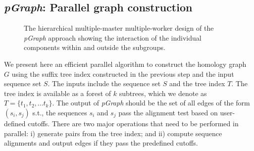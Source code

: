 \documentclass[10pt,journal,letterpaper,compsoc]{IEEEtran}
\begin{document}



\subsection{{\it pGraph}: Parallel graph construction}
\label{secMasterSlave}



\begin{figure}[tb]
\centerline{
						\scalebox{0.65}{}
            }
\caption{
The hierarchical multiple-master multiple-worker design of the {\it pGraph} approach showing the interaction of the individual components within and outside the subgroups.
}
\label{figPClust}
\end{figure}
We present here an efficient parallel algorithm to construct the homology graph $G$ using the suffix tree index constructed in the previous step and the input sequence set $S$.  The inputs include the sequence set $S$ and the tree index $T$. The tree index is available as a forest of $k$ subtrees, which we denote as $T=\{t_1,t_2,\ldots t_k\}$.  The output of {\it pGraph} should be the set of all edges of the form $(s_i,s_j)$ s.t., the sequences $s_i$ and $s_j$ pass the alignment test based on user-defined cutoffs. There are two major operations that need to be performed in parallel: i) generate pairs from the tree index; and ii) compute sequence alignments and output edges if they pass the predefined cutoffs.

\end{document}
